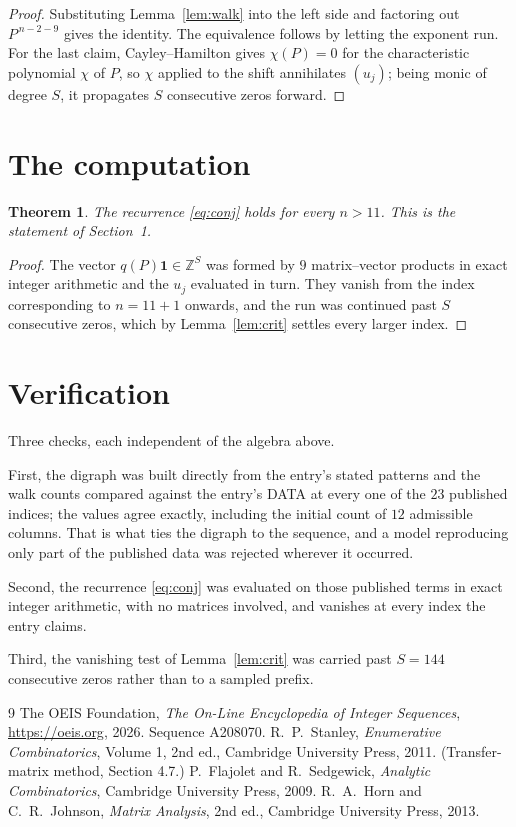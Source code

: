 \documentclass[11pt,a4paper]{article}
\theoremstyle{plain}
\newtheorem{theorem}{Theorem}
\theoremstyle{definition}
\begin{document}
\begin{proof}
Substituting Lemma~\ref{lem:walk} into the left side and factoring out
$P^{\,n-2-9}$ gives the identity. The equivalence follows by letting the exponent
run. For the last claim, Cayley--Hamilton gives $\chi(P)=0$ for the characteristic
polynomial $\chi$ of $P$, so $\chi$ applied to the shift annihilates $(u_j)$; being monic of
degree $S$, it propagates $S$ consecutive zeros forward.
\end{proof}

\section{The computation}

\begin{theorem}
The recurrence \eqref{eq:conj} holds for every $n>11$. This is the statement of
Section~1.
\end{theorem}

\begin{proof}
The vector $q(P)\mathbf{1}\in\mathbb{Z}^{S}$ was formed by $9$ matrix--vector
products in exact integer arithmetic and the $u_j$ evaluated in turn. They vanish from the
index corresponding to $n=11+1$ onwards, and the run was continued past $S$ consecutive
zeros, which by Lemma~\ref{lem:crit} settles every larger index.
\end{proof}

\section{Verification}

Three checks, each independent of the algebra above.

First, the digraph was built directly from the entry's stated patterns and the walk counts
compared against the entry's DATA at every one of the $23$ published indices; the
values agree exactly, including the initial count of $12$ admissible columns. That is
what ties the digraph to the sequence, and a model reproducing only part of the published
data was rejected wherever it occurred.

Second, the recurrence \eqref{eq:conj} was evaluated on those published terms in exact
integer arithmetic, with no matrices involved, and vanishes at every index the entry claims.

Third, the vanishing test of Lemma~\ref{lem:crit} was carried past $S=144$ consecutive
zeros rather than to a sampled prefix.

\begin{thebibliography}{9}
 The OEIS Foundation, \emph{The On-Line Encyclopedia of Integer
Sequences}, \url{https://oeis.org}, 2026. Sequence A208070.
 R.~P.~Stanley, \emph{Enumerative Combinatorics}, Volume 1, 2nd ed.,
Cambridge University Press, 2011. (Transfer-matrix method, Section 4.7.)
 P.~Flajolet and R.~Sedgewick, \emph{Analytic Combinatorics}, Cambridge
University Press, 2009.
 R.~A.~Horn and C.~R.~Johnson, \emph{Matrix Analysis}, 2nd ed., Cambridge
University Press, 2013.
\end{thebibliography}
\end{document}
